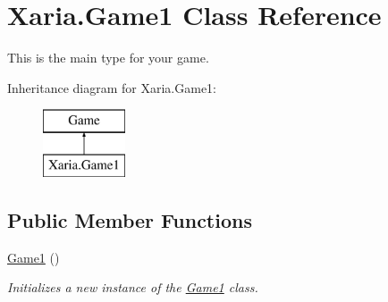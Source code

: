 \hypertarget{classXaria_1_1Game1}{}\section{Xaria.\+Game1 Class Reference}
\label{classXaria_1_1Game1}


This is the main type for your game.  


Inheritance diagram for Xaria.\+Game1\+:\begin{figure}[H]
\begin{center}
\leavevmode
\includegraphics[height=2.000000cm]{classXaria_1_1Game1}
\end{center}
\end{figure}
\subsection*{Public Member Functions}
\begin{DoxyCompactItemize}
\item 
\hyperlink{classXaria_1_1Game1_aa7b8268d52c2f0435734c83f3d76f266}{Game1} ()
\begin{DoxyCompactList}\small\item\em Initializes a new instance of the \hyperlink{classXaria_1_1Game1}{Game1} class. \end{DoxyCompactList}\end{DoxyCompactItemize}

